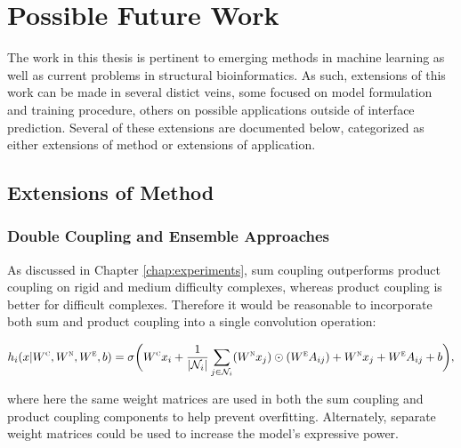 \chapter{Possible Future Work}
\label{chap:future}

The work in this thesis is pertinent to emerging methods in machine learning as well as current problems in structural bioinformatics.
As such, extensions of this work can be made in several distict veins, some focused on model formulation and training procedure, others on possible applications outside of interface prediction.
Several of these extensions are documented below, categorized as either extensions of method or extensions of application.

\section{Extensions of Method}

\subsection{Double Coupling and Ensemble Approaches}

As discussed in Chapter \ref{chap:experiments}, sum coupling outperforms product coupling on rigid and medium difficulty complexes, whereas product coupling is better for difficult complexes.
Therefore it would be reasonable to incorporate both sum and product coupling into a single convolution operation:

\begin{equation}
h_i(x | W^\textsc{c}, W^\textsc{n}, W^\textsc{e}, b) = \sigma \bigg( W^{\textsc{c}} x_i + \frac{1}{|\mathcal{N}_i|}\sum_{j \in \mathcal{N}_i} (W^{\textsc{n}} x_j) \odot (W^{\textsc{e}} A_{ij}) + W^{\textsc{n}} x_j + W^{\textsc{e}} A_{ij} + b \bigg),
\label{eq:double_coupling}
\end{equation}

\noindent
where here the same weight matrices are used in both the sum coupling and product coupling components to help prevent overfitting. 
Alternately, separate weight matrices could be used to increase the model's expressive power.

